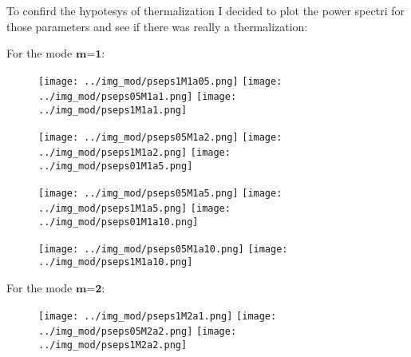 \documentclass[10pt]{article}
\numberwithin{equation}{section}
\begin{document}
To confird the hypotesys of thermalization I decided to plot the power spectri for those parameters and see if there was really a thermalization:

For the mode $\textbf{m=1}$:
\begin{figure}[!htb]
    \texttt{[image: ../img\_mod/pseps1M1a05.png]}
\endminipage \hfill
{}
    \texttt{[image: ../img\_mod/pseps05M1a1.png]}
\endminipage \hfill
{}
    \texttt{[image: ../img\_mod/pseps1M1a1.png]}
\endminipage 
\end{figure}

\begin{figure}[!htb]
    \texttt{[image: ../img\_mod/pseps05M1a2.png]}
\endminipage \hfill
{}
    \texttt{[image: ../img\_mod/pseps1M1a2.png]}
\endminipage \hfill
{}
    \texttt{[image: ../img\_mod/pseps01M1a5.png]}
\endminipage 
\end{figure}


\begin{figure}[!htb]
    \texttt{[image: ../img\_mod/pseps05M1a5.png]}
\endminipage \hfill
{}
    \texttt{[image: ../img\_mod/pseps1M1a5.png]}
\endminipage \hfill
{}
    \texttt{[image: ../img\_mod/pseps01M1a10.png]}
\endminipage 
\end{figure}


\begin{figure}[!htb]
    \texttt{[image: ../img\_mod/pseps05M1a10.png]}
\endminipage \hfill
{}
    \texttt{[image: ../img\_mod/pseps1M1a10.png]}
\endminipage 
\end{figure}

\clearpage

For the mode $\textbf{m=2}$:


\begin{figure}[!htb]
    \texttt{[image: ../img\_mod/pseps1M2a1.png]}
\endminipage \hfill
{}
    \texttt{[image: ../img\_mod/pseps05M2a2.png]}
\endminipage \hfill
{}
    \texttt{[image: ../img\_mod/pseps1M2a2.png]}
\endminipage 
\end{figure}
\end{document}
